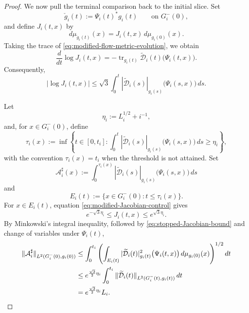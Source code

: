 \documentclass{amsart}
\begin{document}
\begin{proof}
\noindent
We now pull the terminal comparison back to the initial slice. Set
\[
        \check g_i(t):=\Psi_i(t)^*g_i(t)
        \qquad\text{on }G_i^-(0),
\]
and define \(J_i(t,x)\) by
\[
        d\mu_{\check g_i(t)}(x)
        =
        J_i(t,x)\,d\mu_{g_i(0)}(x).
\]
Taking the trace of
\eqref{eq:modified-flow-metric-evolution}, we obtain
\[
        \frac{d}{dt}\log J_i(t,x)
        =
        -\operatorname{tr}_{g_i(t)}
        \widetilde{\mathcal D}_i(t)
        \bigl(\Psi_i(t,x)\bigr).
\]
Consequently,
\begin{equation}
\label{eq:modified-Jacobian-control}
        |\log J_i(t,x)|
        \leq
        \sqrt{3}
        \int_0^t
        |\widetilde{\mathcal D}_i(s)|_{g_i(s)}
        \bigl(\Psi_i(s,x)\bigr)\,ds .
\end{equation}

\noindent
Let
\[
        \eta_i:=L_i^{1/2}+i^{-1},
\]
and, for \(x\in G_i^-(0)\), define
\[
        \tau_i(x)
        :=
        \inf\left\{
        t\in[0,t_i]:
        \int_0^t
        |\widetilde{\mathcal D}_i(s)|_{g_i(s)}
        \bigl(\Psi_i(s,x)\bigr)\,ds
        \geq\eta_i
        \right\},
\]
with the convention \(\tau_i(x)=t_i\) when the threshold is not
attained. Set
\[
        \mathcal A_i^\sharp(x)
        :=
        \int_0^{\tau_i(x)}
        |\widetilde{\mathcal D}_i(s)|_{g_i(s)}
        \bigl(\Psi_i(s,x)\bigr)\,ds
\]
and
\[
        E_i(t):=
        \{x\in G_i^-(0):t\leq\tau_i(x)\}.
\]
For \(x\in E_i(t)\), equation
\eqref{eq:modified-Jacobian-control} gives
\begin{equation}
\label{eq:stopped-Jacobian-bound}
        e^{-\sqrt{3}\eta_i}
        \leq
        J_i(t,x)
        \leq
        e^{\sqrt{3}\eta_i}.
\end{equation}
By Minkowski's integral inequality, followed by
\eqref{eq:stopped-Jacobian-bound} and change of variables under
\(\Psi_i(t)\),
\begin{align}
        \|\mathcal A_i^\sharp\|
        _{L^2(G_i^-(0),g_i(0))}
        &\leq
        \int_0^{t_i}
        \left(
        \int_{E_i(t)}
        |\widetilde{\mathcal D}_i(t)|_{g_i(t)}^2
        \bigl(\Psi_i(t,x)\bigr)
        \,d\mu_{g_i(0)}(x)
        \right)^{1/2}dt
        \notag\\
        &\leq
        e^{\frac{\sqrt{3}}{2}\eta_i}
        \int_0^{t_i}
        \|\widetilde{\mathcal D}_i(t)\|
        _{L^2(G_i^-(t),g_i(t))}\,dt
        \notag\\
        &=
        e^{\frac{\sqrt{3}}{2}\eta_i}L_i .
\label{eq:stopped-accumulation-L2}
\end{align}


\end{proof}
\end{document}
